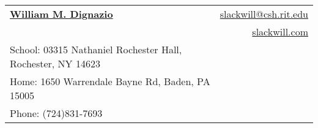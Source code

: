 \documentclass[letterpaper,11pt]{article}
\begin{document}
 

\newcommand{\mywebheader}{
\begin{tabular*}{7in}{l@{\extracolsep{\fill}}r}
	\textbf{\href{http://www.slackwill.com/}{\Huge William M. Dignazio}} & \href{mailto:slackwill@csh.rit.edu}{slackwill@csh.rit.edu}\\ &
	\href{http://slackwill.com/}{slackwill.com} \\
	{\footnotesize {{School: 03315 Nathaniel Rochester Hall,
Rochester, NY 14623}}} & \\
	{\footnotesize {{Home: 1650 Warrendale Bayne Rd, Baden, PA 15005}}} & \\
	{\footnotesize {{Phone: (724)831-7693}}} & 

	\end{tabular*}
\\
\vspace{0.1in}}

\mywebheader
\end{document}
